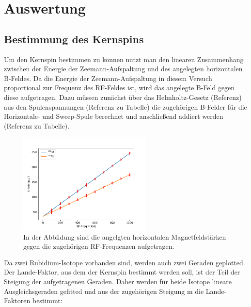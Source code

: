 \newpage
\section{Auswertung}
    \subsection{Bestimmung des Kernspins}
        Um den Kernspin bestimmen zu können nutzt man den linearen Zusammenhang zwischen der Energie der Zeemann-Aufspaltung und des angelegten horizontalen B-Feldes. Da die Energie der Zeemann-Aufspaltung 
        in diesem Versuch proportional zur Frequenz des RF-Feldes ist, wird das angelegte B-Feld gegen diese aufgetragen. Dazu müssen zunächst über das Helmholtz-Gesetz (Referenz) aus den Spulenspannungen 
        (Referenz zu Tabelle) die zugehörigen B-Felder für die Horizontale- und Sweep-Spule berechnet und anschließend addiert werden (Referenz zu Tabelle).  
        
        
        \FloatBarrier

        \begin{figure}[h]
          \centering
          \includegraphics[width = 0.6\textwidth]{pictures/Rb_85_87.pdf}
          \caption{In der Abbildung sind die angelgten horizontalen Magnetfeldstärken gegen die zugehörigen RF-Frequenzen aufgetragen. }
          \label{fig:B_gegen_RF}
        \end{figure}

        \FloatBarrier

        \noindent
        
        
        
        Da zwei Rubidium-Isotope vorhanden sind, werden auch zwei Geraden geplotted. Der Lande-Faktor, aus dem der Kernspin bestimmt werden soll, ist der Teil der Steigung der aufgetragenen Geraden. Daher 
        werden für beide Isotope lineare Ausgleichsgeraden gefitted und aus der zugehörigen Steigung m die Lande-Faktoren bestimmt:

